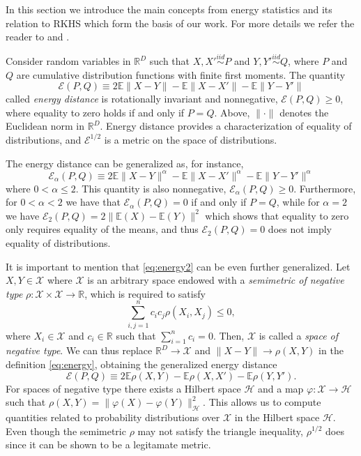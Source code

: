 \documentclass[aps,preprint,nofootinbib,floatfix]{revtex4-1}
\newcommand\Energy{\mathcal{E}}
\newcommand\E{\mathbb{E}}
\begin{document}
In this section we introduce the main concepts from energy
statistics and its relation to 
RKHS which form the basis of our work.
For more details we refer the reader
to \cite{Szkely2013} and \cite{Sejdinovic2013}.

Consider random variables in $\mathbb{R}^D$ 
such that $X,X' \stackrel{iid}{\sim} P$ and 
$Y,Y' \stackrel{iid}{\sim} Q$, where $P$ and $Q$ are cumulative
distribution functions with finite first moments. 
The quantity 
\begin{equation}
\label{eq:energy}
\Energy(P, Q) \equiv 2 \E \| X - Y\| - \E \| X - X' \| - \E \| Y - Y' \|
\end{equation}
called \emph{energy distance} \cite{Szkely2013} 
is rotationally invariant and nonnegative, $\Energy(P,Q) \ge 0$, where
equality
to zero holds if and only if $P = Q$.
Above, $\| \cdot \|$ denotes the
Euclidean norm in $\mathbb{R}^D$. 
Energy distance
provides a characterization of equality of distributions, and
$\Energy^{1/2}$ is
a metric on the space of distributions.

The energy distance can be generalized as, for instance,
\begin{equation}
\label{eq:energy2}
\Energy_\alpha(P, Q) \equiv 
2 \E \| X - Y\|^{\alpha} - \E \| X - X' \|^{\alpha} - 
\E \| Y - Y' \|^{\alpha}
\end{equation}
where $0<\alpha\le 2$. This quantity is also nonnegative,
$\Energy_\alpha(P,Q) \ge 0$. Furthermore, for $0<\alpha<2$ we have that
$\Energy_\alpha(P,Q) = 0$ if and only if $P=Q$, while for $\alpha=2$ 
we have $\Energy_2(P,Q) = 2\| \E(X) - \E(Y) \|^2$ which shows that
equality to zero only requires
equality of the means, and thus $\Energy_2(P,Q)=0$ does 
not imply equality of distributions.

It is important to 
mention that \eqref{eq:energy2} can be even further generalized.
Let $X, Y \in \mathcal{X}$  where $\mathcal{X}$ is an arbitrary space endowed
with a \emph{semimetric of negative type}
$\rho: \mathcal{X}\times\mathcal{X} \to \mathbb{R}$, which is required
to satisfy
\begin{equation}
\label{eq:negative_type}
\sum_{i,j=1}^n c_i c_j \rho(X_i, X_j) \le 0,
\end{equation}
where $X_i \in \mathcal{X}$ and $c_i \in \mathbb{R}$ such that
$\sum_{i=1}^n c_i = 0$. Then, $\mathcal{X}$ is called a \emph{space of
negative type}.
We can thus replace $\mathbb{R}^D \to \mathcal{X}$ and 
$\| X - Y \| \to \rho(X , Y)$ in the definition \eqref{eq:energy}, obtaining
the generalized energy distance
\begin{equation}
\label{eq:energy3}
\Energy(P, Q) \equiv 2 \E \rho(X,Y) - \E \rho(X, X') - \E \rho(Y,Y').
\end{equation}
For spaces of negative type there exists a Hilbert space $\mathcal{H}$ and
a map $\varphi: \mathcal{X} \to
\mathcal{H}$ such that
$\rho(X, Y) = \| \varphi(X) - \varphi(Y) \|_{\mathcal{H}}^2$. This
allows us to compute quantities related to probability distributions over
$\mathcal{X}$ in the Hilbert space $\mathcal{H}$.
Even though the semimetric 
$\rho$ may not satisfy the triangle inequality, 
$\rho^{1/2}$ does since it can be shown to be a legitamate metric. 
\end{document}
